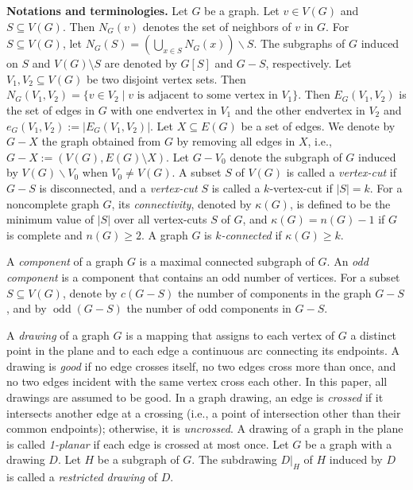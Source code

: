 \documentclass[12pt,a4paper]{article}
\DeclareMathOperator{\odd}{odd}
\begin{document}
\noindent \textbf{Notations and terminologies.}  
Let $G$ be a graph.
Let $v\in V(G)$ and $S\subseteq V(G)$. 
Then  $N_G(v)$   denotes the set of neighbors
of $v$ in $G$.  For $S \subseteq V(G)$, let $N_G(S)=\left(\bigcup_{x \in S} N_G(x)\right) \backslash S$.
The subgraphs of $G$ induced on $S$ and $V(G)\setminus S$ are denoted by
 $G[S]$ and $G-S$, respectively.
Let $V_1,
V_2\subseteq V(G)$ be two disjoint vertex sets. Then $N_G(V_1, V_2) = \{ v \in V_2 \mid \text{$v$ is adjacent to some vertex in $V_1$} \}$.
 Then $E_G(V_1,V_2)$ is the set
of edges in $G$  with one endvertex in $V_1$ and the other endvertex in $V_2$ and  $e_G(V_1,V_2):=|E_G(V_1,V_2)|$. %
Let $X \subseteq E(G)$ be a set of edges. We denote by $G - X$ the graph obtained from $G$ by removing all edges in $X$, i.e.,
$
G - X := (V(G), E(G) \setminus X).
$
Let $G-V_0$ denote the subgraph of $G$ induced by $V(G) \backslash V_0$ when $V_0 \neq V(G)$. A subset $S$ of $V(G)$ is called a \emph{vertex-cut} if $G-S$ is disconnected, and a \emph{vertex-cut} $S$ is called a $k$-vertex-cut if $|S|=k$. For a noncomplete graph $G$, its \emph{connectivity}, denoted by $\kappa(G)$, is defined to be the minimum value of $|S|$ over all vertex-cuts $S$ of $G$, and $\kappa(G)=n(G)-1$ if $G$ is complete and $n(G)\ge 2$. A graph $G$ is \emph{$k$-connected} if $\kappa(G) \geq k$. 

A \emph{component} of a graph $G$ is a maximal connected subgraph of $G$. An \emph{odd component} is a component that contains an odd number of vertices. For a subset $S \subseteq V(G)$, denote by $c(G - S)$ the number of components in the graph $G - S$, and by $\odd(G - S)$ the number of odd components in $G - S$.

A \emph{drawing} of a graph $G$ is a mapping that assigns to each vertex of $G$ a distinct point
in the plane and to each edge a continuous arc connecting its endpoints. A drawing is  \emph{good}
if no edge crosses itself, no two edges cross more than once, and no two edges incident with the same vertex cross each other. In this paper, all drawings are assumed to be good. In a graph drawing, an edge is \emph{crossed} if it intersects another edge at a crossing (i.e., a point of intersection other than their common endpoints); otherwise, it is \emph{uncrossed}. A drawing of a graph in the plane is called \emph{1-planar} if each edge is crossed
at most once. Let $G$ be a graph with a drawing $D$.
Let $H$ be a subgraph of $G$. The subdrawing $\left.D\right|_H$ of $H$ induced by $D$ is called a \emph{restricted drawing }of $D$.
\end{document}
